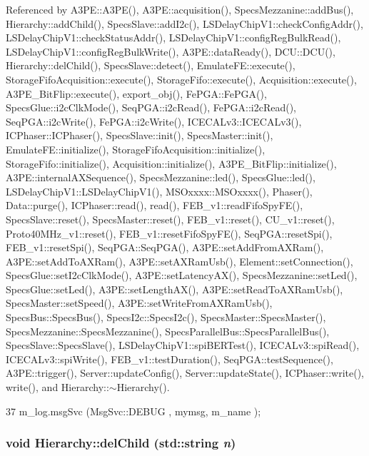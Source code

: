 Referenced by A3PE::A3PE(), A3PE::acquisition(), SpecsMezzanine::addBus(), Hierarchy::addChild(), SpecsSlave::addI2c(), LSDelayChipV1::checkConfigAddr(), LSDelayChipV1::checkStatusAddr(), LSDelayChipV1::configRegBulkRead(), LSDelayChipV1::configRegBulkWrite(), A3PE::dataReady(), DCU::DCU(), Hierarchy::delChild(), SpecsSlave::detect(), EmulateFE::execute(), StorageFifoAcquisition::execute(), StorageFifo::execute(), Acquisition::execute(), A3PE\_\-BitFlip::execute(), export\_\-obj(), FePGA::FePGA(), SpecsGlue::i2cClkMode(), SeqPGA::i2cRead(), FePGA::i2cRead(), SeqPGA::i2cWrite(), FePGA::i2cWrite(), ICECALv3::ICECALv3(), ICPhaser::ICPhaser(), SpecsSlave::init(), SpecsMaster::init(), EmulateFE::initialize(), StorageFifoAcquisition::initialize(), StorageFifo::initialize(), Acquisition::initialize(), A3PE\_\-BitFlip::initialize(), A3PE::internalAXSequence(), SpecsMezzanine::led(), SpecsGlue::led(), LSDelayChipV1::LSDelayChipV1(), MSOxxxx::MSOxxxx(), Phaser(), Data::purge(), ICPhaser::read(), read(), FEB\_\-v1::readFifoSpyFE(), SpecsSlave::reset(), SpecsMaster::reset(), FEB\_\-v1::reset(), CU\_\-v1::reset(), Proto40MHz\_\-v1::reset(), FEB\_\-v1::resetFifoSpyFE(), SeqPGA::resetSpi(), FEB\_\-v1::resetSpi(), SeqPGA::SeqPGA(), A3PE::setAddFromAXRam(), A3PE::setAddToAXRam(), A3PE::setAXRamUsb(), Element::setConnection(), SpecsGlue::setI2cClkMode(), A3PE::setLatencyAX(), SpecsMezzanine::setLed(), SpecsGlue::setLed(), A3PE::setLengthAX(), A3PE::setReadToAXRamUsb(), SpecsMaster::setSpeed(), A3PE::setWriteFromAXRamUsb(), SpecsBus::SpecsBus(), SpecsI2c::SpecsI2c(), SpecsMaster::SpecsMaster(), SpecsMezzanine::SpecsMezzanine(), SpecsParallelBus::SpecsParallelBus(), SpecsSlave::SpecsSlave(), LSDelayChipV1::spiBERTest(), ICECALv3::spiRead(), ICECALv3::spiWrite(), FEB\_\-v1::testDuration(), SeqPGA::testSequence(), A3PE::trigger(), Server::updateConfig(), Server::updateState(), ICPhaser::write(), write(), and Hierarchy::$\sim$Hierarchy().


\begin{DoxyCode}
37 { m_log.msgSvc (MsgSvc::DEBUG   , mymsg, m_name ); }
\end{DoxyCode}
\hypertarget{classHierarchy_a1928ac7615fe0b5e55cd707f70dc6781}{
\subsubsection[{delChild}]{\setlength{\rightskip}{0pt plus 5cm}void Hierarchy::delChild (std::string {\em n})}}
\label{classHierarchy_a1928ac7615fe0b5e55cd707f70dc6781}


